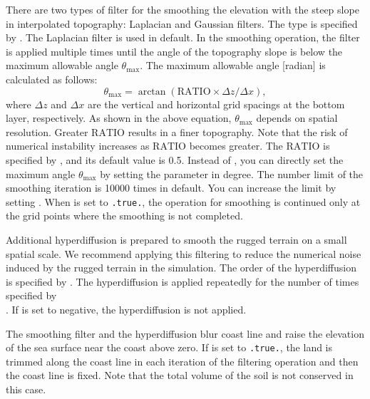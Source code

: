 There are two types of filter for the smoothing the elevation with the steep slope in interpolated topography: Laplacian and Gaussian filters.
The type is specified by . The Laplacian filter is used in default.
In the smoothing operation, the filter is applied multiple times until the angle of the topography slope is below the maximum allowable angle $\theta_{\max}$.
The maximum allowable angle [radian] is calculated as follows:
\begin{equation*}
  \theta_{\max} = \arctan( \mathrm{RATIO} \times \Delta z/\Delta x ),
\end{equation*}
where $\Delta z$ and $\Delta x$ are the vertical and horizontal grid spacings at the bottom layer, respectively.
As shown in the above equation, $\theta_{\max}$ depends on spatial resolution.
Greater $\mathrm{RATIO}$ results in a finer topography.
Note that the risk of numerical instability increases as $\mathrm{RATIO}$ becomes greater.
The $\mathrm{RATIO}$ is specified by , and its default value is 0.5.
Instead of , you can directly set the maximum angle $\theta_{\max}$ by setting the parameter  in degree.
The number limit of the smoothing iteration is 10000 times in default.
You can increase the limit by setting .
When  is set to \verb|.true.|, the operation for smoothing is continued only at the grid points where the smoothing is not completed.

Additional hyperdiffusion is prepared to smooth the rugged terrain on a small spatial scale.
We recommend applying this filtering to reduce the numerical noise induced by the rugged terrain in the simulation.
The order of the hyperdiffusion is specified by .
The hyperdiffusion is applied repeatedly for the number of times specified by \\ .
If  is set to negative, the hyperdiffusion is not applied.


The smoothing filter and the hyperdiffusion blur coast line and raise the elevation of the sea surface near the coast above zero.
If  is set to \verb|.true.|, the land is trimmed along the coast line in each iteration of the filtering operation and then the coast line is fixed.
Note that the total volume of the soil is not conserved in this case.



